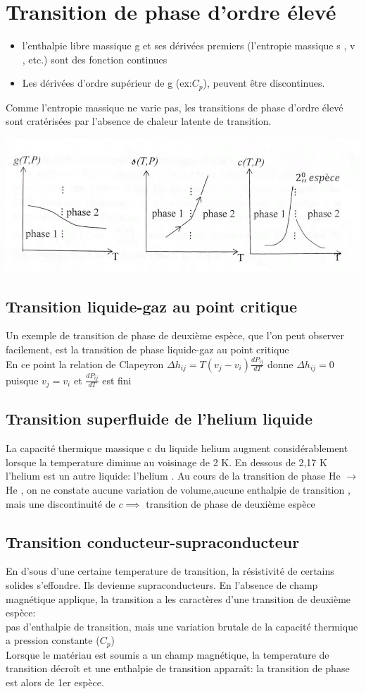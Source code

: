 \documentclass[12pt,oneside]{book}
\begin{document}
\section{Transition de phase d'ordre élevé}
    \begin{itemize}
        \item l’enthalpie libre massique g et ses dérivées premiers (l'entropie massique s , v , etc.) sont des fonction continues
        \item Les dérivées d'ordre supérieur de g (ex:$C_p$), peuvent être discontinues.
    \end{itemize}
    Comme l'entropie massique ne varie pas, les transitions de phase d'ordre élevé sont cratérisées par l'absence de chaleur latente de transition.
    \begin{center}
        \includegraphics[width=0.5\linewidth]{../pic/3300/15.png}
    \end{center}
\subsection{Transition liquide-gaz au point critique}
    Un exemple de transition de phase de deuxième espèce, que l'on peut observer facilement, est la transition de phase liquide-gaz au point critique \\
    En ce point la relation de Clapeyron $\Delta h_{ij} = T(v_j-v_i)\frac{dP_{ij}}{dT}$ donne $\Delta h_{ij} = 0$ puisque $v_j = v_i$ et $\frac{dP_{ij}}{dT}$ est fini 
\subsection{Transition superfluide de l'helium liquide}
    La capacité thermique massique c du liquide helium  augment considérablement lorsque la temperature diminue au voisinage de 2 K. En dessous de 2,17 K l'helium est un autre liquide: l'helium .
    Au cours de la transition de phase He $\to$ He  , on ne constate aucune variation de volume,aucune enthalpie de transition , mais une discontinuité de $c \implies$ transition de phase de deuxième espèce 
\subsection{Transition conducteur-supraconducteur}
    En d’sous d'une certaine temperature de transition, la résistivité de certains solides s'effondre. Ils devienne supraconducteurs. En l'absence de champ magnétique applique, la transition a les caractères d'une transition de deuxième espèce:\\
    pas d'enthalpie de transition, mais une variation brutale de la capacité thermique a pression constante ($C_p$)\\
    Lorsque le matériau est soumis a un champ magnétique, la temperature de transition décroît et une enthalpie de transition apparaît: la transition de phase est alors de 1er espèce.
\end{document}

